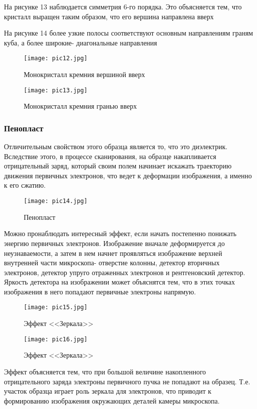 \documentclass[a4paper,12pt]{article}
\theoremstyle{plain} %
\theoremstyle{definition} %
\theoremstyle{remark} %
\begin{document}
На рисунке 13 наблюдается симметрия 6-го порядка. Это объясняется тем, что кристалл выращен таким образом, что его вершина направлена вверх 

На рисунке 14 более узкие полосы соответствуют основным направлениям граням куба, а более широкие- диагональные направления

\begin{figure}[H]
	\centering
	\texttt{[image: pic12.jpg]}
	\caption{Монокристалл кремния вершиной вверх}
	\label{pic12}
\end{figure}

\begin{figure}[H]
	\centering
	\texttt{[image: pic13.jpg]}
	\caption{Монокристалл кремния гранью вверх}
	\label{pic12}
\end{figure}

\subsubsection{Пенопласт}
Отличительным свойством этого образца  является то, что это диэлектрик. Вследствие этого, в процессе сканирования, на образце накапливается отрицательный заряд, который своим полем начинает искажать траекторию движения первичных электронов, что ведет к деформации изображения, а именно к его сжатию.


\begin{figure}[H]
	\centering
	\texttt{[image: pic14.jpg]}
	\caption{Пенопласт}
	\label{pic14}
\end{figure}

Можно пронаблюдать интересный эффект, если начать постепенно понижать энергию первичных электронов. Изображение вначале деформируется до неузнаваемости, а затем в нем начнет проявляться изображение верхней внутренней части микроскопа- отверстие колонны, детектор вторичных электронов, детектор упруго отраженных электронов и рентгеновский детектор. Яркость детектора на изображении может объяснятся тем, что в этих точках изображения в него попадают первичные электроны напрямую.
\begin{figure}[H]
	\centering
	\texttt{[image: pic15.jpg]}
	\caption{Эффект <<Зеркала>>}
	\label{pic15}
\end{figure}

\begin{figure}[H]
	\centering
	\texttt{[image: pic16.jpg]}
	\caption{Эффект <<Зеркала>>}
	\label{pic16}
\end{figure}


Эффект объясняется тем, что при большой величине накопленного отрицательного заряда электроны первичного пучка не попадают на образец. Т.е. участок образца играет роль зеркала для электронов, что приводит к формированию изображения окружающих деталей камеры микроскопа.






	
	
\end{document}
